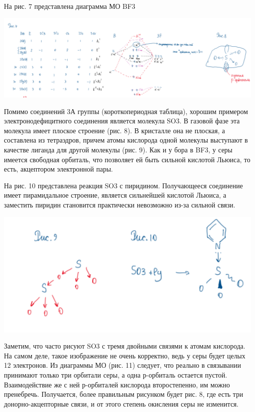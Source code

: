 \documentclass[14pt,a4paper]{scrartcl}
\begin{document}
На рис. 7 представлена диаграмма МО BF3

\includegraphics[scale=0.75]{16v2.png}

Помимо соединений 3А группы (короткопериодная таблица), хорошим примером электронодефицитного соединения является молекула SO3. В газовой фазе эта молекула имеет
плоское строение (рис. 8). В кристалле она не плоская, а составлена из тетраэдров, причем атомы кислорода одной молекулы выступают в качестве лиганда для другой молекулы
(рис. 9). Как и у бора в BF3, у серы имеется свободная орбиталь, что позволяет ей быть сильной кислотой Льюиса, то есть, акцептором электронной пары. 

На рис. 10 представлена реакция SO3 с пиридином. Получающееся соединение имеет пирамидальное строение, является сильнейшей кислотой Льюиса, а заместить пиридин
становится практически невозможно из-за сильной связи.

\includegraphics{16v3.png}

Заметим, что часто рисуют SO3 с тремя двойными связями к атомам кислорода. На самом деле, такое изображение не очень корректно, ведь у серы будет целых 12 электронов. Из
диаграммы МО (рис. 11) следует, что реально в связывании принимают только три орбитали серы, а одна р-орбиталь остается пустой. Взаимодействие же с ней р-орбиталей
кислорода второстепенно, им можно пренебречь. Получается, более правильным рисунком будет рис. 8, где есть три донорно-акцепторные связи, и от этого степень окисления серы
не изменится.
\end{document}
